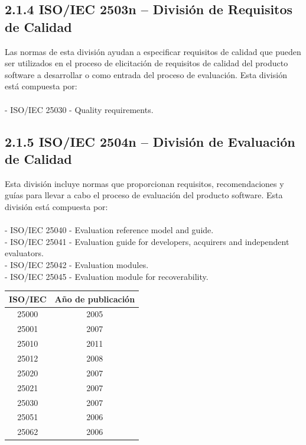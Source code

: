 \documentclass[https://www.overleaf.com/project/63761df255a8a9f4a15c3579
	letterpaper, %
	10pt, %
]{CSUniSchoolLabReport}
\begin{document}
        \subsection*{2.1.4 \hspace{0.5em} ISO/IEC 2503n – División de Requisitos de Calidad}
            Las normas de esta división ayudan a especificar requisitos de calidad que pueden ser utilizados en el proceso de elicitación de requisitos de calidad del producto software a desarrollar o como entrada del proceso de evaluación. Esta división está compuesta por:
            \\\\
            - ISO/IEC 25030 - Quality requirements.

        \subsection*{2.1.5 \hspace{0.5em} ISO/IEC 2504n – División de Evaluación de Calidad}
            Esta división incluye normas que proporcionan requisitos, recomendaciones y guías para llevar a cabo el proceso de evaluación del producto software. Esta división está compuesta por:
            \\\\
            - ISO/IEC 25040 - Evaluation reference model and guide.
            \\
            - ISO/IEC 25041 - Evaluation guide for developers, acquirers and independent evaluators.
            \\
            - ISO/IEC 25042 - Evaluation modules.
            \\
            - ISO/IEC 25045 - Evaluation module for recoverability.

        \begin{center}
            \begin{tabular}{| c | c |}
                \hline
                   ISO/IEC & Año de publicación\\ 
                \hline
                    25000 & 2005\\
                    25001 & 2007\\
                    25010 & 2011\\
                    25012 & 2008\\
                    25020 & 2007\\
                    25021 & 2007\\
                    25030 & 2007\\
                    25051 & 2006\\
                    25062 & 2006\\
                \hline
            \end{tabular}
        \end{center}
        
\end{document}
